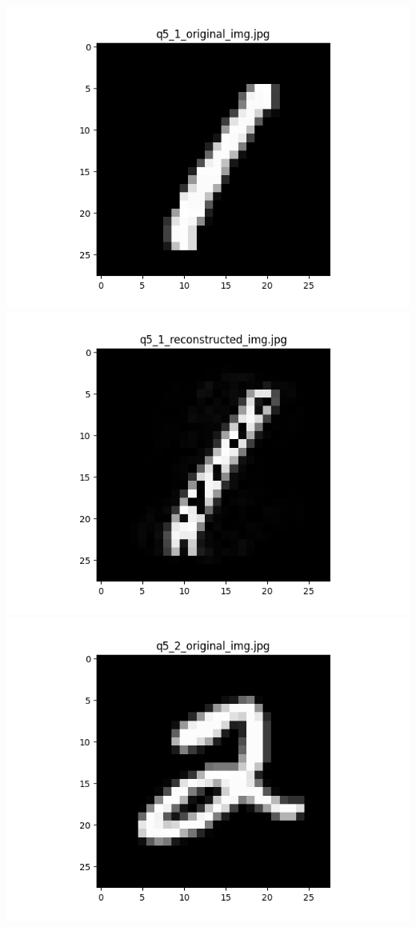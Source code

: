 \documentclass{article}
\begin{document}
    \\
    \includegraphics[scale=.6]{../results/q5/original/q5_1_original.png}
    \includegraphics[scale=.6]{../results/q5/reconstrcuted/q5_1_reconstructed.png}
    \\
    \includegraphics[scale=.6]{../results/q5/original/q5_2_original.png}
\end{document}
